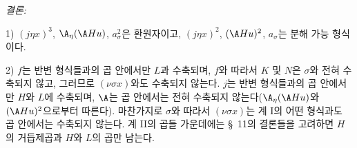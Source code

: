 
\noindent\emph{결론:}

1) $(j\eta x)^3$, $\A_\eta(\A Hu)$, $a_\sigma^2$은 환원자이고, $(j\eta x)^2$, $(\A Hu)^2$, $a_\sigma$는 분해 가능 형식이다.

2) $f$는 반변 형식들과의 곱 안에서만 $L$과 수축되며, $f$와 따라서 $K$ 및 $N$은 $\sigma$와 전혀 수축되지 않고, 그러므로 $(\nu\sigma x)$와도 수축되지 않는다. $j$는 반변 형식들과의 곱 안에서만 $H$와 $L$에 수축되며, $\A$는 곱 안에서는 전혀 수축되지 않는다($\A_\eta(\A Hu)$와 $(\A Hu)^2$으로부터 따른다). 마찬가지로 $\sigma$와 따라서 $(\nu\sigma x)$는 계 I의 어떤 형식과도 곱 안에서는 수축되지 않는다. 계 II의 곱들 가운데에는 \S\ 11의 결론들을 고려하면 $H$의 거듭제곱과 $H$와 $L$의 곱만 남는다.
